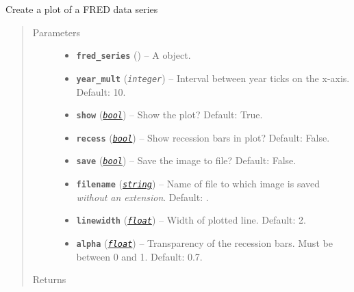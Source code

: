 \documentclass[letterpaper,10pt,english]{sphinxmanual}
\begin{document}
\begin{fulllineitems}
\label{additional_functions:fredpy.quickplot}
Create a plot of a FRED data series
\begin{quote}\begin{description}
\item[{Parameters}] \leavevmode\begin{itemize}
\item {} 
\textbf{\texttt{fred\_series}} ({\hyperref[series_class:fredpy.series]{}}) -- A  object.

\item {} 
\textbf{\texttt{year\_mult}} (\emph{\texttt{integer}}) -- Interval between year ticks on the x-axis. Default: 10.

\item {} 
\textbf{\texttt{show}} (\href{https://docs.python.org/2/library/functions.html\#bool}{\emph{\texttt{bool}}}) -- Show the plot? Default: True.

\item {} 
\textbf{\texttt{recess}} (\href{https://docs.python.org/2/library/functions.html\#bool}{\emph{\texttt{bool}}}) -- Show recession bars in plot? Default: False.

\item {} 
\textbf{\texttt{save}} (\href{https://docs.python.org/2/library/functions.html\#bool}{\emph{\texttt{bool}}}) -- Save the image to file? Default: False.

\item {} 
\textbf{\texttt{filename}} (\href{https://docs.python.org/2/library/string.html\#module-string}{\emph{\texttt{string}}}) -- Name of file to which image is saved \emph{without an extension}. Default: .

\item {} 
\textbf{\texttt{linewidth}} (\href{https://docs.python.org/2/library/functions.html\#float}{\emph{\texttt{float}}}) -- Width of plotted line. Default: 2.

\item {} 
\textbf{\texttt{alpha}} (\href{https://docs.python.org/2/library/functions.html\#float}{\emph{\texttt{float}}}) -- Transparency of the recession bars. Must be between 0 and 1. Default: 0.7.

\end{itemize}

\item[{Returns}] \leavevmode


\end{description}\end{quote}

\end{fulllineitems}
\end{document}
